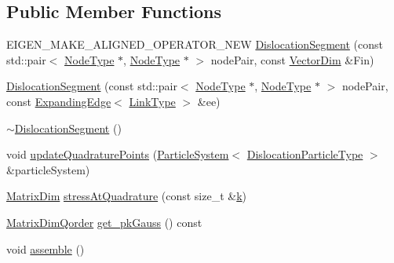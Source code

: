 \subsection*{Public Member Functions}
\begin{DoxyCompactItemize}
\item 
E\+I\+G\+E\+N\+\_\+\+M\+A\+K\+E\+\_\+\+A\+L\+I\+G\+N\+E\+D\+\_\+\+O\+P\+E\+R\+A\+T\+O\+R\+\_\+\+N\+E\+W \hyperlink{classmodel_1_1_dislocation_segment_a4fc857edaf3de0d077097c9a4793906a}{Dislocation\+Segment} (const std\+::pair$<$ \hyperlink{_network_typedefs_8h_a723f680c66f6a92647827790bcbafce0}{Node\+Type} $\ast$, \hyperlink{_network_typedefs_8h_a723f680c66f6a92647827790bcbafce0}{Node\+Type} $\ast$ $>$ node\+Pair, const \hyperlink{_spline_enums_8h_ad5cfc23fc5c8569885db746e503c2e14}{Vector\+Dim} \&Fin)
\item 
\hyperlink{classmodel_1_1_dislocation_segment_a1f08bc2cc90fdf7b1033930791514160}{Dislocation\+Segment} (const std\+::pair$<$ \hyperlink{_network_typedefs_8h_a723f680c66f6a92647827790bcbafce0}{Node\+Type} $\ast$, \hyperlink{_network_typedefs_8h_a723f680c66f6a92647827790bcbafce0}{Node\+Type} $\ast$ $>$ node\+Pair, const \hyperlink{structmodel_1_1_expanding_edge}{Expanding\+Edge}$<$ \hyperlink{_spline_node_base__corder0_8h_ab09ccc0af6ea9402dfef7b0eac55cff3}{Link\+Type} $>$ \&ee)
\item 
\hyperlink{classmodel_1_1_dislocation_segment_a9fc4663d7eae3d3094879044745ed9e8}{$\sim$\+Dislocation\+Segment} ()
\item 
void \hyperlink{classmodel_1_1_dislocation_segment_a9c69289435d5164558e1087a1e7a309e}{update\+Quadrature\+Points} (\hyperlink{structmodel_1_1_particle_system}{Particle\+System}$<$ \hyperlink{classmodel_1_1_dislocation_segment_ae5ede42f748e4f51479ce6891135b5e1}{Dislocation\+Particle\+Type} $>$ \&particle\+System)
\item 
\hyperlink{_spline_enums_8h_ab727134c60058354c77e11b738a0891d}{Matrix\+Dim} \hyperlink{classmodel_1_1_dislocation_segment_ad1972eb3ac074d0ccd9556b6fbaea8e3}{stress\+At\+Quadrature} (const size\+\_\+t \&\hyperlink{_f_e_m_2linear__elasticity__3d_2tetgen_2generate_p_o_l_ycube_8m_a5d2aad4440da75aa43f2643e72b1a3bd}{k})
\item 
\hyperlink{classmodel_1_1_dislocation_segment_a038d9448e2a98c8da218d1dae63576e1}{Matrix\+Dim\+Qorder} \hyperlink{classmodel_1_1_dislocation_segment_a701a12365973062b240e8001ba5e4f34}{get\+\_\+pk\+Gauss} () const 
\item 
void \hyperlink{classmodel_1_1_dislocation_segment_a820a1f47270a24b7f5a1b40d1ba2df5e}{assemble} ()

\end{DoxyCompactItemize}
